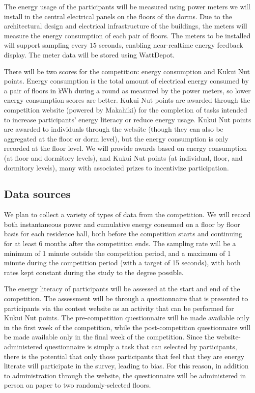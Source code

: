 The energy usage of the participants will be measured using power meters we will install in the central electrical panels on the floors of the dorms. Due to the architectural design and electrical infrastructure of the buildings, the meters will measure the energy consumption of each pair of floors. The meters to be installed will support sampling every 15 seconds, enabling near-realtime energy feedback display. The meter data will be stored using WattDepot.

There will be two scores for the competition: energy consumption and Kukui Nut points. Energy consumption is the total amount of electrical energy consumed by a pair of floors in kWh during a round as measured by the power meters, so lower energy consumption scores are better. Kukui Nut points are awarded through the competition website (powered by Makahiki) for the completion of tasks intended to increase participants' energy literacy or reduce energy usage. Kukui Nut points are awarded to individuals through the website (though they can also be aggregated at the floor or dorm level), but the energy consumption is only recorded at the floor level. We will provide awards based on energy consumption (at floor and dormitory levels), and Kukui Nut points (at individual, floor, and dormitory levels), many with associated prizes to incentivize participation.

\subsection{Data sources}

We plan to collect a variety of types of data from the competition. We will record both instantaneous power and cumulative energy consumed on a floor by floor basis for each residence hall, both before the competition starts and continuing for at least 6 months after the competition ends. The sampling rate will be a minimum of 1 minute outside the competition period, and a maximum of 1 minute during the competition period (with a target of 15 seconds), with both rates kept constant during the study to the degree possible.

The energy literacy of participants will be assessed at the start and end of the competition. The assessment will be through a questionnaire that is presented to participants via the contest website as an activity that can be performed for Kukui Nut points. The pre-competition questionnaire will be made available only in the first week of the competition, while the post-competition questionnaire will be made available only in the final week of the competition. Since the website-administered questionnaire is simply a task that can selected by participants, there is the potential that only those participants that feel that they are energy literate will participate in the survey, leading to bias. For this reason, in addition to administration through the website, the questionnaire will be administered in person on paper to two randomly-selected floors.

